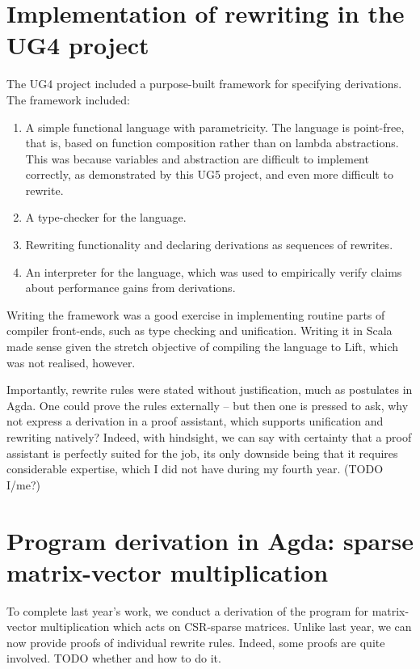 \documentclass[bsc,frontabs,twoside,singlespacing,parskip,deptreport]{infthesis}
\theoremstyle{definition}
\begin{document}
\section{Implementation of rewriting in the UG4 project}
\label{sec:impl-rewr-ug4}

The UG4 project included a purpose-built framework for specifying
derivations. The framework included:

\begin{enumerate}
\item A simple functional language with parametricity. The language is
point-free, that is, based on function composition rather than on
lambda abstractions. This was because variables and abstraction are
difficult to implement correctly, as demonstrated by this UG5 project,
and even more difficult to rewrite.

\item A type-checker for the language.

\item Rewriting functionality and declaring derivations as sequences of
  rewrites.

\item An interpreter for the language, which was used to empirically
  verify claims about performance gains from derivations.
\end{enumerate}

Writing the framework was a good exercise in implementing routine
parts of compiler front-ends, such as type checking and
unification. Writing it in Scala made sense given the stretch
objective of compiling the language to Lift, which was not realised,
however.

Importantly, rewrite rules were stated without justification, much as
postulates in Agda. One could prove the rules externally – but then
one is pressed to ask, why not express a derivation in a proof
assistant, which supports unification and rewriting natively? Indeed,
with hindsight, we can say with certainty that a proof assistant is
perfectly suited for the job, its only downside being that it requires
considerable expertise, which I did not have during my fourth
year. (TODO I/me?)

\section{Program derivation in Agda: sparse matrix-vector
  multiplication}
\label{sec:progr-deriv-agda}

To complete last year's work, we conduct a derivation of the program
for matrix-vector multiplication which acts on CSR-sparse
matrices. Unlike last year, we can now provide proofs of individual
rewrite rules. Indeed, some proofs are quite involved. TODO whether
and how to do it.



\end{document}
